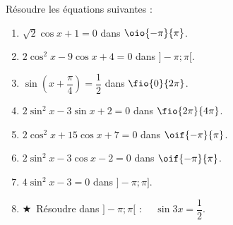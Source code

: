 \documentclass[a4paper,11pt,exos]{nsi} %
\begin{document}
Résoudre les équations suivantes :
\begin{multicols}{2}
	\begin{enumerate}
		\item 	$\sqrt{2}\cos x +1 = 0$ dans $\oio{-\pi}{\pi}$.
		\item 	$2\cos^2x-9\cos x+4=0$ dans $]-\pi;\pi[$.
		\item 	$\sin\left(x+\dfrac{\pi}{4}\right)=\dfrac{1}{2}$ dans $\fio{0}{2\pi}$.
		\item 	$2\sin^2x-3\sin x+2=0$ dans $\fio{2\pi}{4\pi}$.
		\item 	$2\cos^2x+15\cos x+7=0$ dans $\oif{-\pi}{\pi}$.
		\item  	$2\sin^2x-3\cos x-2=0$ dans $\oif{-\pi}{\pi}$.
		\item 	$4\sin^2x-3=0$ dans $]-\pi;\pi]$.
		\item 	$\bigstar$\ Résoudre dans $]-\pi;\pi[$ : $\quad\sin3x=\dfrac{1}{2}$.	
	\end{enumerate}
\end{multicols}
\end{document}
